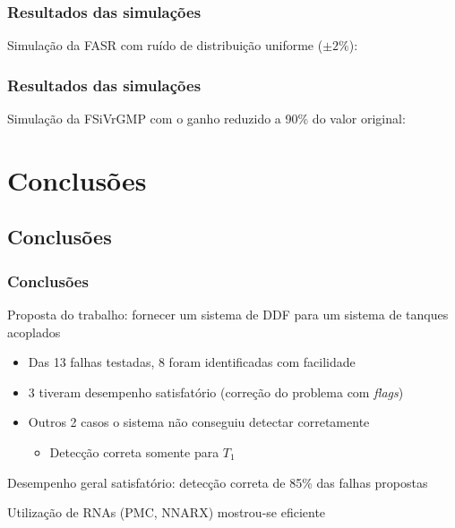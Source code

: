 \documentclass{beamer}
\begin{document}
\begin{frame}
    \frametitle{Resultados das simulações}

\footnotesize Simulação da FASR com ruído de distribuição uniforme ($\pm 2\%$):

\begin{figure}[htb] 
\footnotesize 
\centering 
\scalebox{0.68}{}
\end{figure}
    
\end{frame}

\begin{frame}
    \frametitle{Resultados das simulações}

\footnotesize Simulação da FSiVrGMP com o ganho reduzido a 90\% do valor
original:

\begin{figure}[htb] 
\footnotesize 
\centering 
\scalebox{0.68}{}
\end{figure}
    
\end{frame}

\section{Conclusões}
\subsection*{Conclusões}
\begin{frame}
    \frametitle{Conclusões}

    Proposta do trabalho: fornecer um sistema de DDF para um sistema de tanques
    acoplados

\begin{itemize}
    \item Das 13 falhas testadas, 8 foram identificadas com facilidade
    \item 3 tiveram desempenho satisfatório (correção do problema com {\it
          flags})
    \item Outros 2 casos o sistema não conseguiu detectar corretamente 
    \begin{itemize}
        \item Detecção correta somente para $T_1$
    \end{itemize}
\end{itemize}

    Desempenho geral satisfatório: detecção correta de 85\% das falhas propostas

    \vspace{0.25cm}

    Utilização de RNAs (PMC, NNARX) mostrou-se eficiente

\end{frame}
\end{document}
